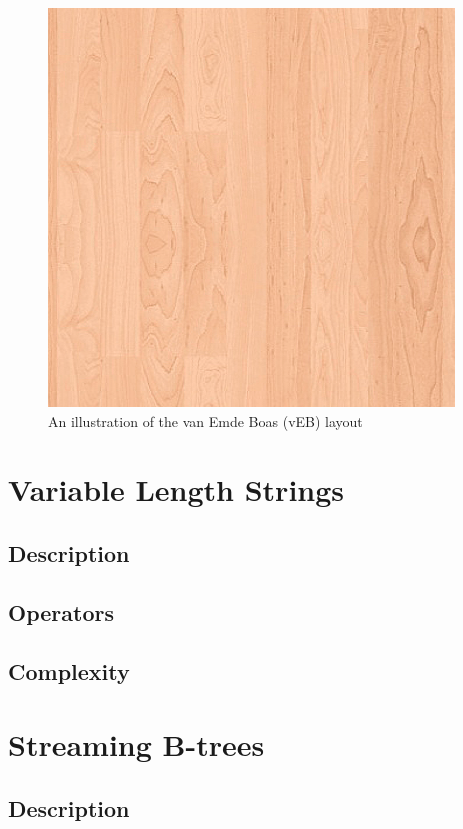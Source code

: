 \documentclass{style}
\begin{document}
\begin{figure}

\begin{center}
	\includegraphics[width=0.8\columnwidth]{figures/veb.png}
\end{center}

\caption{An illustration of the van Emde Boas (vEB) layout}
\label{fig:veb}
\end{figure}


\section{Variable Length Strings}

\subsection{Description}

\subsection{Operators}

\subsection{Complexity}

\section{Streaming B-trees}

\subsection{Description}
\end{document}
